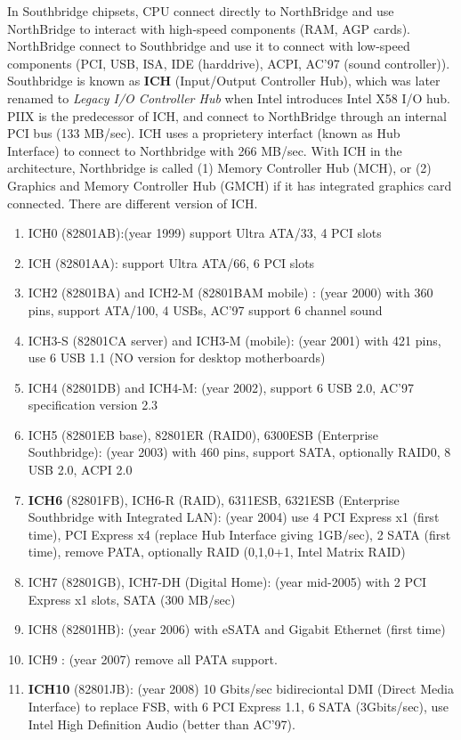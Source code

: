 In Southbridge chipsets, CPU connect directly to NorthBridge and use NorthBridge
to interact with high-speed components (RAM, AGP cards). NorthBridge connect to
Southbridge and use it to connect with low-speed components (PCI, USB, ISA, IDE
(harddrive), ACPI, AC'97 (sound controller)). Southbridge is known as {\bf ICH}
(Input/Output Controller Hub), which was later renamed to {\it Legacy I/O
Controller Hub} when Intel introduces Intel X58 I/O hub. PIIX is the predecessor
of ICH, and connect to NorthBridge through an internal PCI bus (133 MB/sec). ICH
uses a proprietery interfact (known as Hub Interface) to connect to Northbridge
with 266 MB/sec.
With ICH in the architecture, Northbridge is called (1) Memory Controller Hub
(MCH), or (2) Graphics and Memory Controller Hub (GMCH) if it has integrated
graphics card connected. There are different version of ICH.
\begin{enumerate}
  \item ICH0 (82801AB):(year 1999) support Ultra ATA/33, 4 PCI slots
  \item ICH (82801AA): support Ultra ATA/66, 6 PCI slots
  \item ICH2 (82801BA) and ICH2-M (82801BAM mobile) : (year 2000) with
  360 pins, support ATA/100, 4 USBs, AC'97 support 6 channel sound
  \item ICH3-S (82801CA server) and ICH3-M (mobile): (year 2001) with 421
  pins, use 6 USB 1.1 (NO version for desktop motherboards)
  \item ICH4 (82801DB) and ICH4-M: (year 2002), support 6 USB 2.0, AC'97
  specification version 2.3
  \item ICH5 (82801EB base), 82801ER (RAID0), 6300ESB (Enterprise Southbridge):
  (year 2003) with 460 pins, support SATA, optionally RAID0, 8 USB 2.0, ACPI 2.0
  \item {\bf ICH6} (82801FB), ICH6-R (RAID), 6311ESB, 6321ESB (Enterprise
  Southbridge with Integrated LAN):  (year 2004) use 4 PCI Express x1 (first
  time), PCI Express x4 (replace Hub Interface giving 1GB/sec), 2 SATA (first
  time), remove PATA, optionally RAID (0,1,0+1, Intel Matrix RAID) 
  
  \item ICH7 (82801GB), ICH7-DH (Digital Home): (year mid-2005) with 2 PCI
  Express x1 slots, SATA (300 MB/sec)
  \item ICH8 (82801HB): (year 2006) with eSATA and Gigabit Ethernet (first time)
  \item ICH9 : (year 2007) remove all PATA support.
  \item {\bf ICH10} (82801JB): (year 2008) 10 Gbits/sec bidireciontal DMI
  (Direct Media Interface) to replace FSB, with 6 PCI Express 1.1, 6 SATA (3Gbits/sec),
  use Intel High  Definition Audio (better than AC'97).
\end{enumerate}



